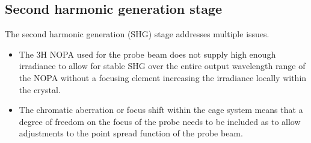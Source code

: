 \documentclass[twoside,openright,listof=numbered]{scrreprt}
\begin{document}
\subsection{Second harmonic generation stage}\label{sec:SHG-Stage-desc}
The second harmonic generation (SHG) stage addresses multiple issues. 
\begin{itemize}
\item The 3H NOPA used for the probe beam does not supply high enough irradiance to allow for stable SHG over the entire output wavelength range of the NOPA without a focusing element increasing the irradiance locally within the crystal. 
\item The chromatic aberration or focus shift within the cage system means that a degree of freedom on the focus of the probe needs to be included as to allow adjustments to the point spread function of the probe beam.
\end{itemize}
\end{document}

